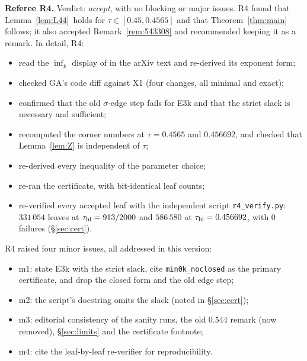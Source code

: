 \documentclass[11pt]{amsart}
\theoremstyle{definition}
\theoremstyle{remark}
\newcommand{\Lfp}{Lemma~\ref{lem:L44}}
\begin{document}
\smallskip
\noindent\textbf{Referee R4.} Verdict: \emph{accept}, with no blocking or major issues. R4 found that \Lfp\ holds for
$\tau\in[0.45,0.4565]$ and that Theorem~\ref{thm:main} follows; it also accepted Remark~\ref{rem:543308} and recommended keeping it as a remark.
In detail, R4:
\begin{itemize}[leftmargin=*]
\item read the $\inf_k$ display of \cite[Proposition~12.1]{GM} in the arXiv text and re-derived its exponent form;
\item checked GA's code diff against X1 (four changes, all minimal and exact);
\item confirmed that the old $\sigma$-edge step fails for E3k and that the strict slack is necessary and sufficient;
\item recomputed the corner numbers at $\tau=0.4565$ and $0.456692$, and checked that Lemma~\ref{lem:Z} is independent of $\tau$;
\item re-derived every inequality of the parameter choice;
\item re-ran the certificate, with bit-identical leaf counts;
\item re-verified every accepted leaf with the independent script \nolinkurl{r4_verify.py}: $331\,054$ leaves at $\tau_{\rm hi}=913/2000$ and $586\,580$ at
$\tau_{\rm hi}=0.456692$, with $0$ failures (\S\ref{sec:cert}).
\end{itemize}
R4 raised four minor issues, all addressed in this version:
\begin{itemize}[leftmargin=*]
\item m1: state E3k with the strict slack, cite \texttt{min0k\_noclosed} as the primary certificate, and drop the closed form and the old edge step;
\item m2: the script's docstring omits the slack (noted in \S\ref{sec:cert});
\item m3: editorial consistency of the sanity runs, the old $0.544$ remark (now removed), \S\ref{sec:limits} and the certificate footnote;
\item m4: cite the leaf-by-leaf re-verifier for reproducibility.
\end{itemize}
\end{document}
